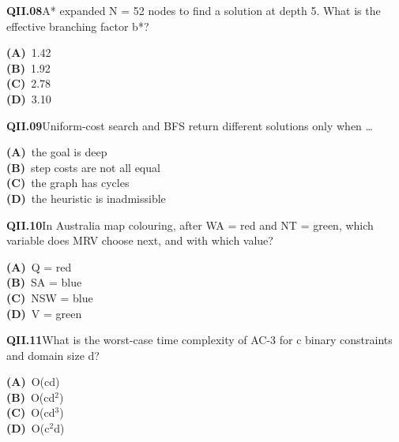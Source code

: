 \begin{tcolorbox}[enhanced,breakable,colback=white,colframe=navyL,arc=2mm,boxrule=0.7pt,left=3mm,right=3mm,top=2mm,bottom=2mm]
\textbf{\color{navy}QII.08}\quad A* expanded N = 52 nodes to find a solution at depth 5. What is the effective branching factor b*?\hfill{}\par\smallskip
{\small \textbf{\color{navyL}(A)}\ 1.42\\[1pt]\textbf{\color{navyL}(B)}\ 1.92\\[1pt]\textbf{\color{navyL}(C)}\ 2.78\\[1pt]\textbf{\color{navyL}(D)}\ 3.10}
\end{tcolorbox}
\begin{tcolorbox}[enhanced,breakable,colback=white,colframe=navyL,arc=2mm,boxrule=0.7pt,left=3mm,right=3mm,top=2mm,bottom=2mm]
\textbf{\color{navy}QII.09}\quad Uniform-cost search and BFS return different solutions only when \dots{}\hfill{}\par\smallskip
{\small \textbf{\color{navyL}(A)}\ the goal is deep\\[1pt]\textbf{\color{navyL}(B)}\ step costs are not all equal\\[1pt]\textbf{\color{navyL}(C)}\ the graph has cycles\\[1pt]\textbf{\color{navyL}(D)}\ the heuristic is inadmissible}
\end{tcolorbox}
\begin{tcolorbox}[enhanced,breakable,colback=white,colframe=navyL,arc=2mm,boxrule=0.7pt,left=3mm,right=3mm,top=2mm,bottom=2mm]
\textbf{\color{navy}QII.10}\quad In Australia map colouring, after WA = red and NT = green, which variable does MRV choose next, and with which value?\hfill{}\par\smallskip
{\small \textbf{\color{navyL}(A)}\ Q = red\\[1pt]\textbf{\color{navyL}(B)}\ SA = blue\\[1pt]\textbf{\color{navyL}(C)}\ NSW = blue\\[1pt]\textbf{\color{navyL}(D)}\ V = green}
\end{tcolorbox}
\begin{tcolorbox}[enhanced,breakable,colback=white,colframe=navyL,arc=2mm,boxrule=0.7pt,left=3mm,right=3mm,top=2mm,bottom=2mm]
\textbf{\color{navy}QII.11}\quad What is the worst-case time complexity of AC-3 for c binary constraints and domain size d?\hfill{}\par\smallskip
{\small \textbf{\color{navyL}(A)}\ O(cd)\\[1pt]\textbf{\color{navyL}(B)}\ O(cd$^2$)\\[1pt]\textbf{\color{navyL}(C)}\ O(cd$^3$)\\[1pt]\textbf{\color{navyL}(D)}\ O(c$^2$d)}
\end{tcolorbox}
